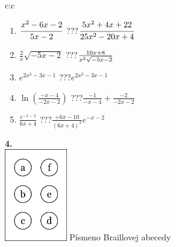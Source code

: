 \documentclass[10pt]{report}
\begin{document}
\begin{tabular}{c:c}
\begin{minipage}[c][104.5mm][t]{0.5\linewidth}
\begin{center}
\begin{minipage}{0.79\linewidth}
\begin{center}
\begin{varwidth}{\linewidth}
\begin{enumerate}
\item $\cfrac{x^2-6x-2}{5x-2}$\quad \dotfill\; ???\;\dotfill \quad $\cfrac{5x^2+4x+22}{25x^2-20x+4}$
\item $\frac{2}{x}\sqrt{-5x-2}$\quad \dotfill\; ???\;\dotfill \quad $\frac{10x+8}{x^2 \sqrt{\smash[b]{-5x-2}}}$
\item $e^{2x^2-3x-1}$\quad \dotfill\; ???\;\dotfill \quad $e^{2x^2-3x-1}$
\item $\ln{\left(\frac{-x-4}{-2x-2}\right)}$\quad \dotfill\; ???\;\dotfill \quad $\frac{-1}{-x-4}+\frac{-2}{-2x-2}$
\item $\frac{e^{-x-2}}{6x+4}$\quad \dotfill\; ???\;\dotfill \quad $\frac{+6x-10}{(6x+4)^2}e^{-x-2}$
\end{enumerate}
\end{varwidth}
\end{center}
\end{minipage}
\begin{minipage}{0.20\linewidth}
\begin{center}
{\Huge\bfseries 4.} \\[2mm]
\includegraphics[height=40mm]{../images/braille.png}
{\small Písmeno Braillovej abecedy}
\end{center}
\end{minipage}
\end{center}
\end{minipage}
%
\end{tabular}
\newpage
\thispagestyle{empty}
\end{document}
